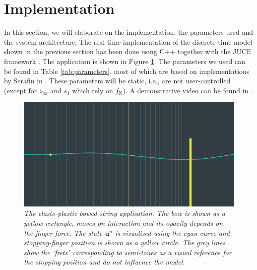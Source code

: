 \documentclass[twoside,a4paper,dvipsnames]{article}
\begin{document}
\section{Implementation}\label{sec:implementation}
In this section, we will elaborate on the implementation; the parameters used and the system architecture. The real-time implementation of the discrete-time model shown in the previous section has been done using C++ together with the JUCE framework \cite{JUCE}. The application is shown in Figure \ref{fig:application}. The parameters we used can be found in Table \ref{tab:parameters}, most of which are based on implementations by Serafin in \cite{Serafin2004}. These parameters will be static, i.e., are not user-controlled (except for $z_\text{ba}$ and $s_3$ which rely on $f_\text{N}$). A demonstrative video can be found in \cite{video}.
    \begin{figure}[ht]
\centerline{\includegraphics[width=1.0\columnwidth]{JUCEapp.png}}
\caption{\label{fig:application}{\it The elasto-plastic bowed string application. The bow is shown as a yellow rectangle, moves on interaction and its opacity depends on the finger force. The state $\mathbf{u}^n$ is visualised using the cyan curve and stopping-finger position is shown as a yellow circle. The grey lines show the `frets' corresponding to semi-tones as a visual reference for the stopping position and do not influence the model.}}
\end{figure}
\end{document}
